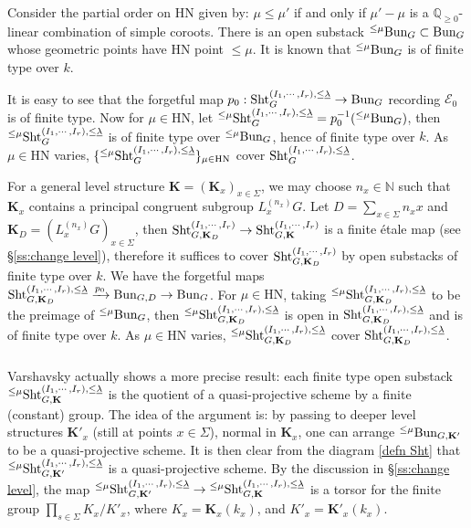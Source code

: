\documentclass[11pt]{amsart}
\numberwithin{equation}{section}
\theoremstyle{plain}
\theoremstyle{definition}
\def\NN{\mathbb{N}}
\def\QQ{\mathbb{Q}}
\newcommand\cE{\mathcal{E}}
\def\bK{\mathbf{K}}
\newcommand{\Bun}{\textup{Bun}}
\newcommand\Sht{\textup{Sht}}
\newcommand\un{\underline}
\newcommand\sss{\subsubsection}
\newcommand\xr{\xrightarrow}
\newcommand{\Sig}{\Sigma}
\renewcommand{\l}{\lambda}
\newcommand{\HN}{\mathrm{HN}}
\begin{document}
Consider the partial order on $\HN$ given by: $\mu\le \mu'$ if and only if $\mu'-\mu $ is a $\QQ_{\ge0}$-linear combination of simple coroots. There is an open substack ${}^{\le\mu}\Bun_{G}\subset \Bun_{G}$ whose geometric points have HN point $\le \mu$. It is known that ${}^{\le\mu}\Bun_{G}$ is of finite type over $k$.

It is easy to see that the forgetful map $p_{0}: \Sht^{(I_{1},\cdots, I_{r}), \le \un\l}_{G}\to \Bun_{G}$ recording $\cE_{0}$ is of finite type. Now for $\mu\in \HN$, let ${}^{\le \mu}\Sht^{(I_{1},\cdots, I_{r}), \le \un\l}_{G}=p_{0}^{-1}({}^{\le \mu}\Bun_{G})$, then ${}^{\le \mu}\Sht^{(I_{1},\cdots, I_{r}), \le \un\l}_{G}$ is of finite type over ${}^{\le \mu}\Bun_{G}$, hence of finite type over $k$. As $\mu\in \HN$ varies, $\{{}^{\le \mu}\Sht^{(I_{1},\cdots, I_{r}),\le\un\l}_{G}\}_{\mu\in\HN}$ cover $\Sht^{(I_{1},\cdots, I_{r}),\le\un\l}_{G}$.


For a general level structure $\bK=(\bK_{x})_{x\in \Sig}$, we may choose $n_{x}\in\NN$ such that $\bK_{x}$ contains a principal congruent subgroup $L^{(n_{x})}_{x}G$. Let $D=\sum_{x\in \Sig}n_{x}x$ and $\bK_{D}=(L^{(n_{x})}_{x}G)_{x\in \Sig}$, then $\Sht^{(I_{1},\cdots, I_{r})}_{G,\bK_{D}}\to \Sht^{(I_{1},\cdots, I_{r})}_{G,\bK}$ is a finite \'etale map (see \S\ref{ss:change level}), therefore it suffices to cover $\Sht^{(I_{1},\cdots, I_{r})}_{G,\bK_{D}}$ by open substacks of finite type over $k$. We have the forgetful maps $\Sht^{(I_{1},\cdots, I_{r}),\le\un\l}_{G,\bK_{D}}\xr{p_{0}}\Bun_{G,D}\to \Bun_{G}$. For $\mu\in \HN$, taking ${}^{\le \mu}\Sht^{(I_{1},\cdots, I_{r}),\le\un\l}_{G,\bK_{D}}$ to be the preimage of ${}^{\le\mu}\Bun_{G}$, then ${}^{\le \mu}\Sht^{(I_{1},\cdots, I_{r}),\le\un\l}_{G,\bK_{D}}$ is open in $\Sht^{(I_{1},\cdots, I_{r}),\le\un\l}_{G,\bK_{D}}$ and is of finite type over $k$. As $\mu\in \HN$ varies, ${}^{\le \mu}\Sht^{(I_{1},\cdots, I_{r}),\le\un\l}_{G,\bK_{D}}$ cover $\Sht^{(I_{1},\cdots, I_{r}),\le\un\l}_{G,\bK_{D}}$.


\sss{} Varshavsky \cite[Prop.2.16(1)]{Var} actually shows a more precise result:  each finite type open substack  ${}^{\le\mu}\Sht^{(I_{1},\cdots, I_{r}), \le\un\l}_{G,\bK}$ is the quotient of a  quasi-projective scheme by a finite (constant) group.  The idea of the argument is: by passing to deeper level structures $\bK'_{x}$ (still at points $x\in \Sig$), normal in $\bK_{x}$, one can arrange ${}^{\le\mu}\Bun_{G,\bK'}$ to be a quasi-projective scheme. It is then clear from the diagram \eqref{defn Sht} that  ${}^{\le\mu}\Sht^{(I_{1},\cdots, I_{r}), \le\un\l}_{G,\bK'}$ is a quasi-projective scheme. By the discussion in \S\ref{ss:change level}, the map ${}^{\le\mu}\Sht^{(I_{1},\cdots, I_{r}), \le\un\l}_{G,\bK'}\to {}^{\le\mu}\Sht^{(I_{1},\cdots, I_{r}), \le\un\l}_{G,\bK}$ is a torsor for the finite group $\prod_{s\in \Sig}K_{x}/K'_{x}$, where $K_{x}=\bK_{x}(k_{x})$, and $K'_{x}=\bK'_{x}(k_{x})$.
\end{document}

